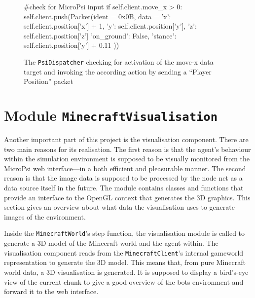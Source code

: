 		\begin{figure}[ht]
			\centering
			\begin{minipage}{11cm}
				\begin{pseudocode}
#check for MicroPsi input
if self.client.move_x > 0:
    self.client.push(Packet(ident = 0x0B, data = {
        'x': self.client.position['x'] + 1,
        'y': self.client.position['y'],
        'z': self.client.position['z']
        'on_ground': False,
        'stance': self.client.position['y'] + 0.11
        }))
					\end{pseudocode}
				\caption{The \texttt{PsiDispatcher} checking for activation of the move-x data target and invoking the according action by sending a ``Player Position'' packet}
				\label{listing_dispatch}
			\end{minipage}
		\end{figure}

    \section{Module \texttt{MinecraftVisualisation}}
    
Another important part of this project is the visualisation component. There are two main reasons for its realisation. The first reason is that the agent's behaviour within the simulation environment is supposed to be visually monitored from the MicroPsi web interface---in a both efficient and pleasurable manner. The second reason is that the image data is supposed to be processed by the node net as a data source itself in the future. The module contains classes and functions that provide an interface to the OpenGL context that generates the 3D graphics. This section gives an overview about what data the visualisation uses to generate images of the environment. 

Inside the \texttt{MinecraftWorld}'s step function, the visualisation module is called to generate a 3D model of the Minecraft world and the agent within. The visualisation component reads from the \texttt{MinecraftClient}'s internal gameworld representation to generate the 3D model. This means that, from pure Minecraft world data, a 3D visualisation is generated. It is supposed to display a bird's-eye view of the current chunk to give a good overview of the bots environment and forward it to the web interface.

